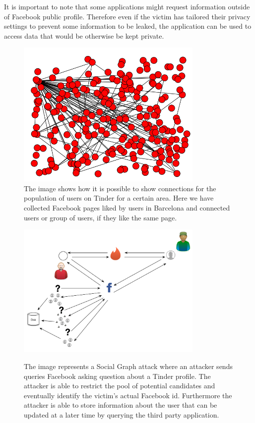 It is important to note that some applications might request information outside of Facebook public profile. Therefore even if the victim has tailored their privacy settings to prevent some information to be leaked, the application can be used to access data that would be otherwise be kept private.

\begin{figure}[t]
\centering
\includegraphics[width=90mm]{figures/figure_connections.png}
\caption[Facebook pages likes by Tinder users.]{The image shows how it is possible to show connections for the population of users on Tinder for a certain area. Here we have collected Facebook pages liked by users in Barcelona and connected users or group of users, if they like the same page.\label{fig:connections}}
\end{figure}

\begin{figure}[tb!]
\centering\hspace*{\fill}
{\includegraphics[width=90mm]{figures/attack_scenario.png}%
\label{graph}}\hspace*{\fill}
\caption[Social Graph attack]{The image represents a Social Graph attack where an attacker sends queries Facebook asking question about a Tinder profile. The attacker is able to restrict the pool of potential candidates and eventually identify the victim's actual Facebook id. Furthermore the attacker is able to store information about the user that can be updated at a later time by querying the third party application.}
\label{fig:fgs}
\end{figure}

